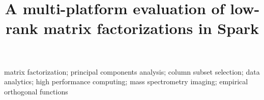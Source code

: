 \documentclass[10pt, conference, compsocconf]{IEEEtran}
\begin{document}
\title{A multi-platform evaluation of low-rank matrix factorizations in Spark}

\author{
}
\maketitle

\begin{abstract}

\end{abstract}

\begin{IEEEkeywords}
  matrix factorization; principal components analysis; column subset selection; data analytics; high performance computing; mass spectrometry imaging; empirical orthogonal functions
\end{IEEEkeywords}










\end{document}
